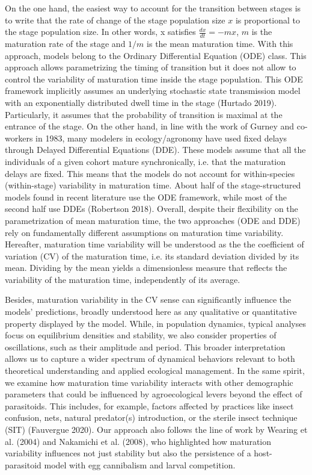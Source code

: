 \documentclass[12pt,a4paper,onecolumn]{article}
\begin{document}
\tabto{1 cm}On the one hand, the easiest way to account for the transition between stages is to write that the rate of change of the stage population size $x$ is proportional to the stage population size. In other words, x satisfies $\frac{dx}{dt} = -mx$, $m$ is the maturation rate of the stage and $1/m$ is the mean maturation time. With this approach, models belong to the Ordinary Differential Equation (ODE) class. This approach allows parametrizing the timing of transition but it does not allow to control the variability of maturation time inside the stage population. This ODE framework implicitly assumes an underlying stochastic state transmission model with an exponentially distributed dwell time in the stage (Hurtado 2019). Particularly, it assumes that the probability of transition is maximal at the entrance of the stage. On the other hand, in line with the work of Gurney and co-workers in 1983, many modelers in ecology/agronomy have used fixed delays through Delayed Differential Equations (DDE). These models assume that all the individuals of a given cohort mature synchronically, i.e. that the maturation delays are fixed. This means that the models do not account for within-species (within-stage) variability in maturation time.  About half of the stage-structured models found in recent literature use the ODE framework, while most of the second half use DDEs (Robertson 2018). Overall, despite their flexibility on the parametrization of mean maturation time, the two approaches (ODE and DDE)  rely on fundamentally different assumptions on maturation time variability. Hereafter, maturation time variability will be understood as the the coefficient of variation (CV) of the maturation time, i.e. its standard deviation divided by its mean. Dividing by the mean yields a dimensionless measure that reflects the variability of the maturation time, independently of its average.

\tabto{1cm} Besides, maturation variability in the CV sense can significantly influence the models' predictions, broadly understood here as any qualitative or quantitative property displayed by the model. While, in population dynamics, typical analyses focus on equilibrium densities and stability, we also consider properties of oscillations, such as their amplitude and period. This broader interpretation allows us to capture a wider spectrum of dynamical behaviors relevant to both theoretical understanding and applied ecological management. In the same spirit, we examine how maturation time variability interacts with other demographic parameters that could be influenced by agroecological levers beyond the effect of parasitoids. This includes, for example, factors affected by practices like insect confusion, nets, natural predator(s) introduction, or the sterile insect technique (SIT) (Fauvergue 2020). Our approach also follows the line of work by Wearing et al. (2004) and Nakamichi et al. (2008), who highlighted how maturation variability influences not just stability but also the persistence of a host-parasitoid model with egg cannibalism and larval competition. 
\end{document}
